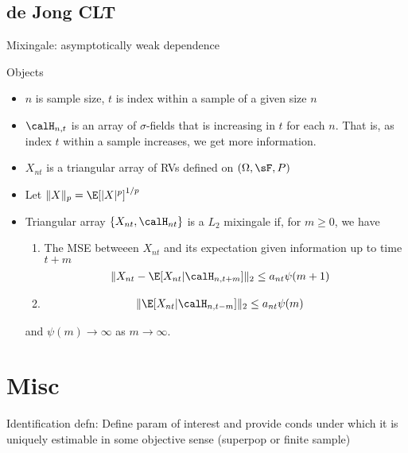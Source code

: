 \documentclass[12pt]{article}
\theoremstyle{plain}
\theoremstyle{definition}
\theoremstyle{remark}
\newcommand{\ra}{\rightarrow}
\begin{document}
\subsection{de Jong CLT}

Mixingale: asymptotically weak dependence

Objects
\begin{itemize}
  \item $n$ is sample size, $t$ is index within a sample of a given size
    $n$

  \item $\calH_{n,t}$ is an array of $\sigma$-fields that is increasing
    in $t$ for each $n$.
    That is, as index $t$ within a sample increases, we get more
    information.

  \item $X_{nt}$ is a triangular array of RVs defined on
    $(\Omega,\sF,P)$

  \item Let $\lVert X\rVert_p=\E[|X|^p]^{1/p}$

  \item Triangular array $\{X_{nt},\calH_{nt}\}$ is a $L_2$ mixingale
    if, for $m\geq 0$, we have
    \begin{enumerate}
      \item
        The MSE betweeen $X_{nt}$ and its expectation given information
        up to time $t+m$
        \begin{align*}
          \lVert
          X_{nt} -\E[X_{nt}|\calH_{n,t+m}]
          \rVert_2
          &\leq
          a_{nt}\psi(m+1)
        \end{align*}

      \item
        \begin{align*}
          \lVert
          \E[X_{nt}|\calH_{n,t-m}]
          \rVert_2
          &\leq
          a_{nt}\psi(m)
        \end{align*}
    \end{enumerate}
    and $\psi(m)\ra\infty$ as $m\ra\infty$.

\end{itemize}


\clearpage
\section{Misc}

Identification defn: Define param of interest and provide conds under
which it is uniquely estimable in some objective sense (superpop or
finite sample)
\end{document}
